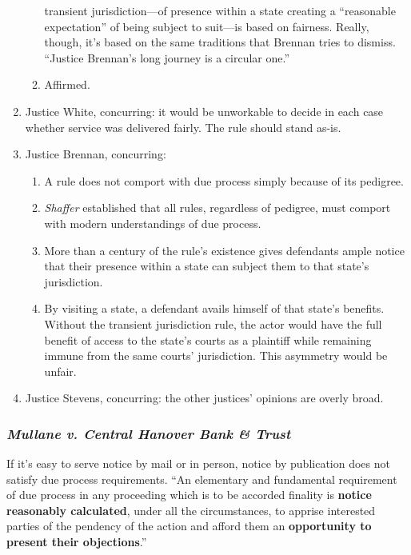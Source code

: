 \begin{enumerate}
\begin{enumerate}
        transient jurisdiction---of presence within a state creating a 
        ``reasonable expectation'' of being subject to suit---is based on 
        fairness. Really, though, it's based on the same traditions that 
        Brennan tries to dismiss. ``Justice Brennan's long journey is a 
        circular one.''
        \item Affirmed.
    \end{enumerate}
    \item Justice White, concurring: it would be unworkable to decide in each case whether service 
        was delivered fairly. The rule should stand as-is.
    \item Justice Brennan, concurring:
    \begin{enumerate}
        \item A rule does not comport with due process simply because of its 
        pedigree.
        \item \emph{Shaffer} established that all rules, regardless of 
        pedigree, must comport with modern understandings of due process.
        \item More than a century of the rule's existence gives defendants 
        ample notice that their presence within a state can subject them to 
        that state's jurisdiction.
        \item By visiting a state, a defendant avails himself of that state's 
        benefits. Without the transient jurisdiction rule, the actor would 
        have the full benefit of access to the state's courts as a plaintiff 
        while remaining immune from the same courts' jurisdiction. This 
        asymmetry would be unfair.
    \end{enumerate}
    \item Justice Stevens, concurring: the other justices' opinions are overly broad.
\end{enumerate}

\subsubsection{\emph{Mullane v. Central Hanover Bank \& Trust}}

If it's easy to serve notice by mail or in person, notice by publication does 
not satisfy due process requirements.  ``An elementary and fundamental 
requirement of due process in any proceeding which is to be accorded finality 
is \textbf{notice reasonably calculated}, under all the circumstances, to 
apprise interested parties of the pendency of the action and afford them an 
\textbf{opportunity to present their objections}.''

